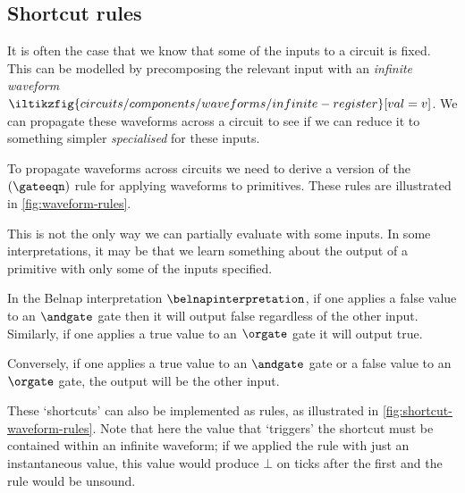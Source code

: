 \subsection{Shortcut rules}

It is often the case that we know that some of the inputs to a circuit is fixed.
This can be modelled by precomposing the relevant input with an
\emph{infinite waveform} \(
\iltikzfig{circuits/components/waveforms/infinite-register}[val=v]
\).
We can propagate these waveforms across a circuit to see if we can reduce it to
something simpler \emph{specialised} for these inputs.

To propagate waveforms across circuits we need to derive a version of the
\((\gateeqn)\) rule for applying waveforms to primitives.
These rules are illustrated in \cref{fig:waveform-rules}.



This is not the only way we can partially evaluate with some inputs.
In some interpretations, it may be that we learn something about the output of
a primitive with only some of the inputs specified.

\begin{example}
    In the Belnap interpretation \(\belnapinterpretation\), if one applies a
    false value to an \(\andgate\) gate then it will output false regardless of
    the other input.
    Similarly, if one applies a true value to an \(\orgate\) gate it will output
    true.

    Conversely, if one applies a true value to an \(\andgate\) gate or a false
    value to an \(\orgate\) gate, the output will be the other input.
\end{example}

These `shortcuts' can also be implemented as rules, as illustrated in
\cref{fig:shortcut-waveform-rules}.
Note that here the value that `triggers' the shortcut must be contained within
an infinite waveform; if we applied the rule with just an instantaneous value,
this value would produce \(\bot\) on ticks after the first and the rule would
be unsound.



